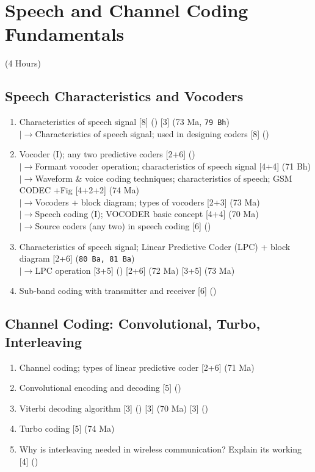 \documentclass[12pt]{article}
\newcommand{\lb}{\\$\left|\rightarrow\right.$}
\begin{document}
\pagebreak
\section{Speech and Channel Coding Fundamentals}
\begin{center}(4 Hours)\end{center}

  \subsection{Speech Characteristics and Vocoders}
    \begin{enumerate}[topsep=0pt, noitemsep]
      \item Characteristics of speech signal \hfill [8] () [3] (73 Ma, \texttt{79 Bh})
        \lb Characteristics of speech signal; used in designing coders \hfill [8] ()
      \item Vocoder (I); any two predictive coders \hfill [2+6] ()
        \lb Formant vocoder operation; characteristics of speech signal \hfill [4+4] (71 Bh)
        \lb Waveform \& voice coding techniques; characteristics of speech; GSM CODEC +Fig \hfill [4+2+2] (74 Ma)
        \lb Vocoders + block diagram; types of vocoders \hfill [2+3] (73 Ma)
        \lb Speech coding (I); VOCODER basic concept \hfill [4+4] (70 Ma)
        \lb Source coders (any two) in speech coding \hfill [6] ()
      \item Characteristics of speech signal; Linear Predictive Coder (LPC) + block diagram \hfill [2+6] (\texttt{80 Ba, 81 Ba})
        \lb LPC operation \hfill [3+5] () [2+6] (72 Ma) [3+5] (73 Ma)
      \item Sub-band coding with transmitter and receiver \hfill [6] ()
    \end{enumerate}

  \subsection{Channel Coding: Convolutional, Turbo, Interleaving}
    \begin{enumerate}[topsep=0pt, noitemsep]
      \item Channel coding; types of linear predictive coder \hfill [2+6] (71 Ma)
      \item Convolutional encoding and decoding \hfill [5] ()
      \item Viterbi decoding algorithm \hfill [3] () [3] (70 Ma) [3] ()
      \item Turbo coding \hfill [5] (74 Ma)
      \item Why is interleaving needed in wireless communication? Explain its working \hfill [4] ()
    \end{enumerate}
\end{document}
